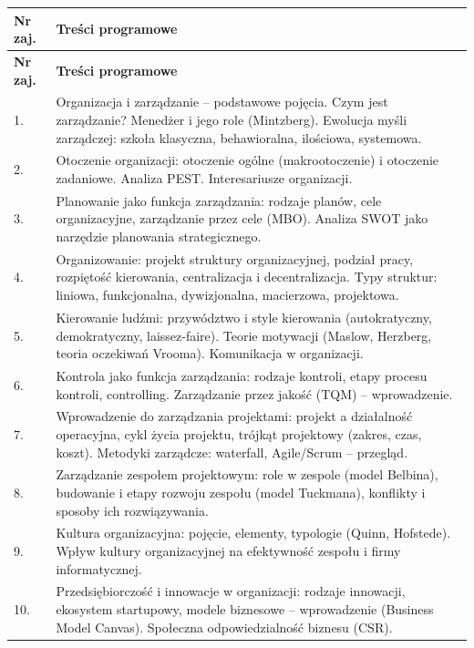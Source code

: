 \documentclass[12pt, a4paper]{article}
\newcommand{\thdrule}{\noalign{\global\setlength{\extrarowheight}{0pt}}}
\newcommand{\thdend}{\noalign{\global\setlength{\extrarowheight}{3pt}}}
\begin{document}
{\scriptsize
\begin{longtable}{m{1.5cm}m{14.5cm}}
\thdrule\toprule
\rowcolor{pjatkRed} {\color{white}\textbf{Nr zaj.}} & {\color{white}\textbf{Treści programowe}} \\
\midrule\thdend
\endfirsthead
\thdrule\toprule
\rowcolor{pjatkRed} {\color{white}\textbf{Nr zaj.}} & {\color{white}\textbf{Treści programowe}} \\
\midrule\thdend
\endhead
  \rowcolor{tableRowLight} 1. & Organizacja i zarządzanie – podstawowe pojęcia. Czym jest zarządzanie? Menedżer i jego role (Mintzberg). Ewolucja myśli zarządczej: szkoła klasyczna, behawioralna, ilościowa, systemowa. \\
  \rowcolor{tableRowAlt} 2. & Otoczenie organizacji: otoczenie ogólne (makrootoczenie) i otoczenie zadaniowe. Analiza PEST. Interesariusze organizacji. \\
  \rowcolor{tableRowLight} 3. & Planowanie jako funkcja zarządzania: rodzaje planów, cele organizacyjne, zarządzanie przez cele (MBO). Analiza SWOT jako narzędzie planowania strategicznego. \\
  \rowcolor{tableRowAlt} 4. & Organizowanie: projekt struktury organizacyjnej, podział pracy, rozpiętość kierowania, centralizacja i decentralizacja. Typy struktur: liniowa, funkcjonalna, dywizjonalna, macierzowa, projektowa. \\
  \rowcolor{tableRowLight} 5. & Kierowanie ludźmi: przywództwo i style kierowania (autokratyczny, demokratyczny, laissez-faire). Teorie motywacji (Maslow, Herzberg, teoria oczekiwań Vrooma). Komunikacja w organizacji. \\
  \rowcolor{tableRowAlt} 6. & Kontrola jako funkcja zarządzania: rodzaje kontroli, etapy procesu kontroli, controlling. Zarządzanie przez jakość (TQM) – wprowadzenie. \\
  \rowcolor{tableRowLight} 7. & Wprowadzenie do zarządzania projektami: projekt a działalność operacyjna, cykl życia projektu, trójkąt projektowy (zakres, czas, koszt). Metodyki zarządcze: waterfall, Agile/Scrum – przegląd. \\
  \rowcolor{tableRowAlt} 8. & Zarządzanie zespołem projektowym: role w zespole (model Belbina), budowanie i etapy rozwoju zespołu (model Tuckmana), konflikty i sposoby ich rozwiązywania. \\
  \rowcolor{tableRowLight} 9. & Kultura organizacyjna: pojęcie, elementy, typologie (Quinn, Hofstede). Wpływ kultury organizacyjnej na efektywność zespołu i firmy informatycznej. \\
  \rowcolor{tableRowAlt} 10. & Przedsiębiorczość i innowacje w organizacji: rodzaje innowacji, ekosystem startupowy, modele biznesowe – wprowadzenie (Business Model Canvas). Społeczna odpowiedzialność biznesu (CSR). \\
\bottomrule
\end{longtable}}
\end{document}
